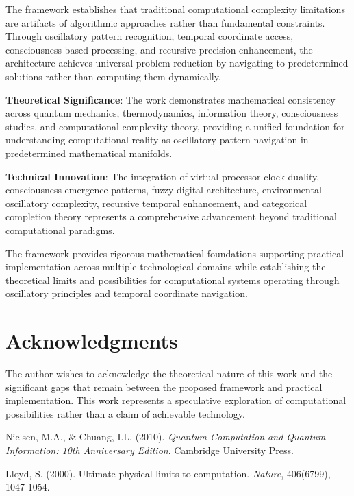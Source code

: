 \documentclass[12pt,a4paper]{article}
\theoremstyle{definition}
\begin{document}
{The framework establishes that traditional computational complexity limitations are artifacts of algorithmic approaches rather than fundamental constraints. Through oscillatory pattern recognition, temporal coordinate access, consciousness-based processing, and recursive precision enhancement, the architecture achieves universal problem reduction by navigating to predetermined solutions rather than computing them dynamically.

\textbf{Theoretical Significance}: The work demonstrates mathematical consistency across quantum mechanics, thermodynamics, information theory, consciousness studies, and computational complexity theory, providing a unified foundation for understanding computational reality as oscillatory pattern navigation in predetermined mathematical manifolds.

\textbf{Technical Innovation}: The integration of virtual processor-clock duality, consciousness emergence patterns, fuzzy digital architecture, environmental oscillatory complexity, recursive temporal enhancement, and categorical completion theory represents a comprehensive advancement beyond traditional computational paradigms.

The framework provides rigorous mathematical foundations supporting practical implementation across multiple technological domains while establishing the theoretical limits and possibilities for computational systems operating through oscillatory principles and temporal coordinate navigation.

\section{Acknowledgments}

The author wishes to acknowledge the theoretical nature of this work and the significant gaps that remain between the proposed framework and practical implementation. This work represents a speculative exploration of computational possibilities rather than a claim of achievable technology.


\begin{thebibliography}{99}

Nielsen, M.A., \& Chuang, I.L. (2010). \emph{Quantum Computation and Quantum Information: 10th Anniversary Edition}. Cambridge University Press.

Lloyd, S. (2000). Ultimate physical limits to computation. \emph{Nature}, 406(6799), 1047-1054.


\end{thebibliography}}
\end{document}
